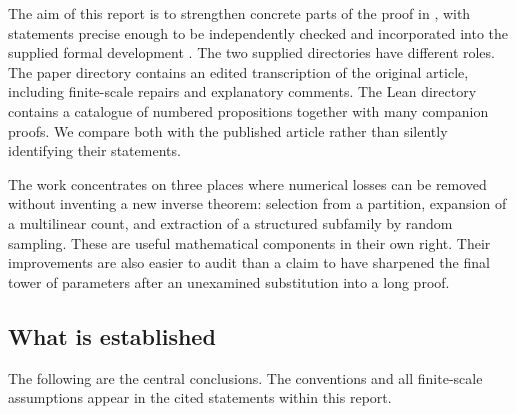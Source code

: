 \documentclass[11pt,letterpaper]{article}
\numberwithin{equation}{section}
\theoremstyle{definition}
\theoremstyle{remark}
\newcommand{\1}{\mathbf 1}
\begin{document}
The aim of this report is to strengthen concrete parts of the proof in
\cite{gowers}, with statements precise enough to be independently
checked and incorporated into the supplied formal development
\cite{repo03}. The two supplied directories have different roles.
The paper directory contains an edited transcription of the original
article, including finite-scale repairs and explanatory comments. The
Lean directory contains a catalogue of numbered propositions together with
many companion proofs. We compare both with the published article rather
than silently identifying their statements.

The work concentrates on three places where numerical losses can be
removed without inventing a new inverse theorem: selection from a
partition, expansion of a multilinear count, and extraction of a
structured subfamily by random sampling. These are useful mathematical
components in their own right. Their improvements are also easier to
audit than a claim to have sharpened the final tower of parameters after
an unexamined substitution into a long proof.

\subsection{What is established}

The following are the central conclusions. The conventions and all
finite-scale assumptions appear in the cited statements within this
report.
\end{document}

